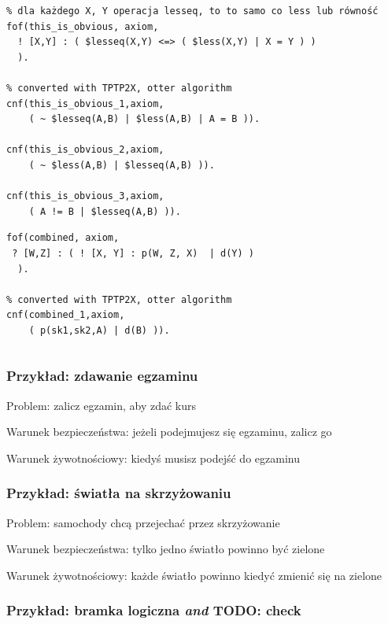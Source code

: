 \documentclass[a4paper,12pt]{article}
\begin{document}
\begin{verbatim}
% dla każdego X, Y operacja lesseq, to to samo co less lub równość
fof(this_is_obvious, axiom,
  ! [X,Y] : ( $lesseq(X,Y) <=> ( $less(X,Y) | X = Y ) )
  ).

% converted with TPTP2X, otter algorithm
cnf(this_is_obvious_1,axiom,
    ( ~ $lesseq(A,B) | $less(A,B) | A = B )).

cnf(this_is_obvious_2,axiom,
    ( ~ $less(A,B) | $lesseq(A,B) )).

cnf(this_is_obvious_3,axiom,
    ( A != B | $lesseq(A,B) )).
\end{verbatim}

\begin{verbatim}
fof(combined, axiom,
 ? [W,Z] : ( ! [X, Y] : p(W, Z, X)  | d(Y) )
  ).

% converted with TPTP2X, otter algorithm
cnf(combined_1,axiom,
    ( p(sk1,sk2,A) | d(B) )).
\end{verbatim}

\begin{verbatim}
\end{verbatim}


\subsubsection{Przykład: zdawanie egzaminu}

\noindent
Problem: zalicz egzamin, aby zdać kurs

\noindent
Warunek bezpieczeństwa: jeżeli podejmujesz się egzaminu, zalicz go

\noindent
Warunek żywotnościowy: kiedyś musisz podejść do egzaminu

\subsubsection{Przykład: światła na skrzyżowaniu}

\noindent
Problem: samochody chcą przejechać przez skrzyżowanie

\noindent
Warunek bezpieczeństwa: tylko jedno światło powinno być zielone

\noindent
Warunek żywotnościowy: każde światło powinno kiedyć zmienić się na zielone

\subsubsection{Przykład: bramka logiczna \textit{and} TODO: check}
\end{document}

